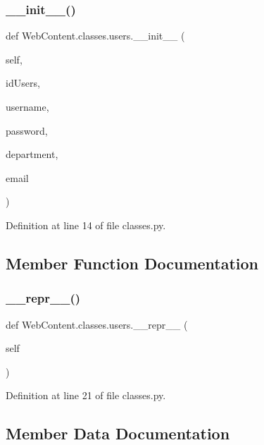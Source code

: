 \subsubsection{\texorpdfstring{\+\_\+\+\_\+init\+\_\+\+\_\+()}{\_\_init\_\_()}}
{\footnotesize\ttfamily def Web\+Content.\+classes.\+users.\+\_\+\+\_\+init\+\_\+\+\_\+ (\begin{DoxyParamCaption}\item[{}]{self,  }\item[{}]{id\+Users,  }\item[{}]{username,  }\item[{}]{password,  }\item[{}]{department,  }\item[{}]{email }\end{DoxyParamCaption})}



Definition at line 14 of file classes.\+py.



\subsection{Member Function Documentation}
\mbox{\label{class_web_content_1_1classes_1_1users_a84e8d242e4e64e56b9a038f2927ae71b}} 
\subsubsection{\texorpdfstring{\+\_\+\+\_\+repr\+\_\+\+\_\+()}{\_\_repr\_\_()}}
{\footnotesize\ttfamily def Web\+Content.\+classes.\+users.\+\_\+\+\_\+repr\+\_\+\+\_\+ (\begin{DoxyParamCaption}\item[{}]{self }\end{DoxyParamCaption})}



Definition at line 21 of file classes.\+py.



\subsection{Member Data Documentation}
\mbox{\label{class_web_content_1_1classes_1_1users_afd71cf2bea8a6b8fd393fd651f2448cc}} 
